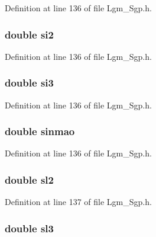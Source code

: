 Definition at line 136 of file Lgm\_\-Sgp.h.\hypertarget{struct___sgp_info_61a1945bc1d3f4c395b657c4203ceb2a}{
\subsubsection[{si2}]{\setlength{\rightskip}{0pt plus 5cm}double {\bf si2}}}
\label{struct___sgp_info_61a1945bc1d3f4c395b657c4203ceb2a}




Definition at line 136 of file Lgm\_\-Sgp.h.\hypertarget{struct___sgp_info_5e144ba52a7d297f9c6dfcd5380e49d1}{
\subsubsection[{si3}]{\setlength{\rightskip}{0pt plus 5cm}double {\bf si3}}}
\label{struct___sgp_info_5e144ba52a7d297f9c6dfcd5380e49d1}




Definition at line 136 of file Lgm\_\-Sgp.h.\hypertarget{struct___sgp_info_ac6611ed753f0b5e0e50d51f6a8fc3b8}{
\subsubsection[{sinmao}]{\setlength{\rightskip}{0pt plus 5cm}double {\bf sinmao}}}
\label{struct___sgp_info_ac6611ed753f0b5e0e50d51f6a8fc3b8}




Definition at line 136 of file Lgm\_\-Sgp.h.\hypertarget{struct___sgp_info_24aba20cbbf42da0d081954b34834924}{
\subsubsection[{sl2}]{\setlength{\rightskip}{0pt plus 5cm}double {\bf sl2}}}
\label{struct___sgp_info_24aba20cbbf42da0d081954b34834924}




Definition at line 137 of file Lgm\_\-Sgp.h.\hypertarget{struct___sgp_info_18b9a2f918f88752c91b220bf3531d31}{
\subsubsection[{sl3}]{\setlength{\rightskip}{0pt plus 5cm}double {\bf sl3}}}
\label{struct___sgp_info_18b9a2f918f88752c91b220bf3531d31}




